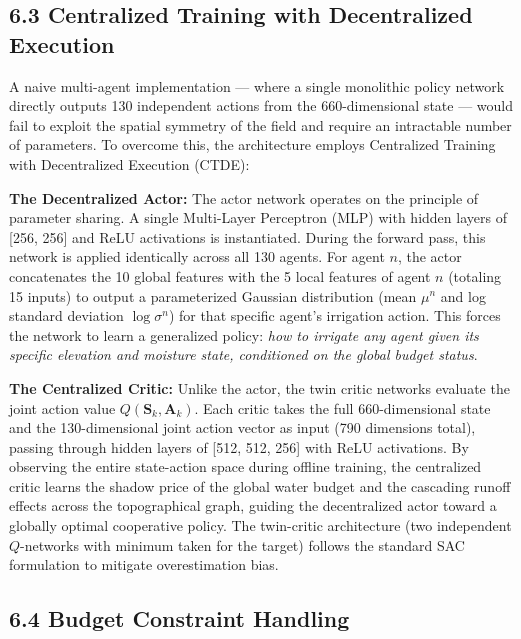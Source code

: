 \subsection{6.3 Centralized Training with Decentralized
Execution}\label{centralized-training-with-decentralized-execution}

A naive multi-agent implementation --- where a single monolithic policy
network directly outputs 130 independent actions from the
660-dimensional state --- would fail to exploit the spatial symmetry of
the field and require an intractable number of parameters. To overcome
this, the architecture employs Centralized Training with Decentralized
Execution (CTDE):

\textbf{The Decentralized Actor:} The actor network operates on the
principle of parameter sharing. A single Multi-Layer Perceptron (MLP)
with hidden layers of {[}256, 256{]} and ReLU activations is
instantiated. During the forward pass, this network is applied
identically across all 130 agents. For agent \(n\), the actor
concatenates the 10 global features with the 5 local features of agent
\(n\) (totaling 15 inputs) to output a parameterized Gaussian
distribution (mean \(\mu^n\) and log standard deviation
\(\log \sigma^n\)) for that specific agent's irrigation action. This
forces the network to learn a generalized policy: \emph{how to irrigate
any agent given its specific elevation and moisture state, conditioned
on the global budget status}.

\textbf{The Centralized Critic:} Unlike the actor, the twin critic
networks evaluate the joint action value
\(Q(\mathbf{S}_k, \mathbf{A}_k)\). Each critic takes the full
660-dimensional state and the 130-dimensional joint action vector as
input (790 dimensions total), passing through hidden layers of {[}512,
512, 256{]} with ReLU activations. By observing the entire state-action
space during offline training, the centralized critic learns the shadow
price of the global water budget and the cascading runoff effects across
the topographical graph, guiding the decentralized actor toward a
globally optimal cooperative policy. The twin-critic architecture (two
independent \(Q\)-networks with minimum taken for the target) follows
the standard SAC formulation to mitigate overestimation bias.

\subsection{6.4 Budget Constraint
Handling}\label{budget-constraint-handling}

